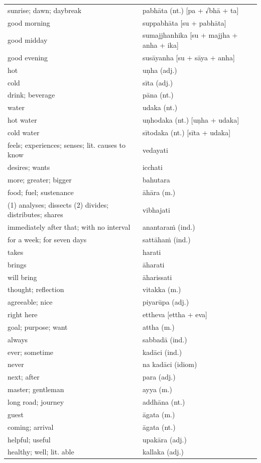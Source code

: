 \documentclass[11pt,oneside]{memoir}
\begin{document}
\begin{center}
\begin{tabular}{ll}
sunrise; dawn; daybreak & pabhāta (nt.) [pa + √bhā + ta]\\
good morning & suppabhāta [su + pabhāta]\\
good midday & sumajjhanhika [su + majjha + anha + ika]\\
good evening & susāyanha [su + sāya + anha]\\
hot & uṇha (adj.)\\
cold & sīta (adj.)\\
drink; beverage & pāna (nt.)\\
water & udaka (nt.)\\
hot water & uṇhodaka (nt.) [uṇha + udaka]\\
cold water & sītodaka (nt.) [sīta + udaka]\\
feels; experiences; senses; lit. causes to know & vedayati\\
desires; wants & icchati\\
more; greater; bigger & bahutara\\
food; fuel; sustenance & āhāra (m.)\\
(1) analyses; dissects (2) divides; distributes; shares & vibhajati\\
immediately after that; with no interval & anantaraṁ (ind.)\\
for a week; for seven days & sattāhaṁ (ind.)\\
takes & harati\\
brings & āharati\\
will bring & āharissati\\
thought; reflection & vitakka (m.)\\
agreeable; nice & piyarūpa (adj.)\\
right here & ettheva [ettha + eva]\\
goal; purpose; want & attha (m.)\\
always & sabbadā (ind.)\\
ever; sometime & kadāci (ind.)\\
never & na kadāci (idiom)\\
next; after & para (adj.)\\
master; gentleman & ayya (m.)\\
long road; journey & addhāna (nt.)\\
guest & āgata (m.)\\
coming; arrival & āgata (nt.)\\
helpful; useful & upakāra (adj.)\\
healthy; well; lit. able & kallaka (adj.)\\
\end{tabular}
\end{center}
\end{document}
